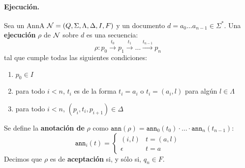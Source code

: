 \paragraph{Ejecución.} Sea un AnnA $\mathcal{N} = (Q, \Sigma, \Lambda, \Delta, I, F)$ y un documento $d = a_0 \ldots a_{n-1} \in \Sigma^*$. Una \textbf{ejecución} $\rho$ de $\mathcal{N}$ sobre $d$ es una secuencia:
$$
    \rho: p_0 \stackrel{t_0}{\rightarrow} p_1 \stackrel{t_1}{\rightarrow} \ldots \stackrel{t_{n-1}}{\rightarrow} p_n
$$
tal que cumple todas las siguientes condiciones:
\begin{enumerate}
    \item $p_0 \in I$
    \item para todo $i < n$, $t_i$ es de la forma $t_i = a_i$ o $t_i = (a_i, l)$ para algún $l \in \Lambda$
    \item para todo $i < n$, $(p_i, t_i, p_{i+1}) \in \Delta$
\end{enumerate}

Se define la \textbf{anotación de} $\rho$ como $\texttt{ann}(\rho) = \texttt{ann}_0(t_0) \cdot \ldots \cdot \texttt{ann}_n(t_{n-1})$:
$$
    \texttt{ann}_i(t)= \begin{cases}(i, l) & t=(a, l) \\ \epsilon & t=a\end{cases}
$$
Decimos que $\rho$ es de \textbf{aceptación} si, y sólo si, $q_n \in F$.

